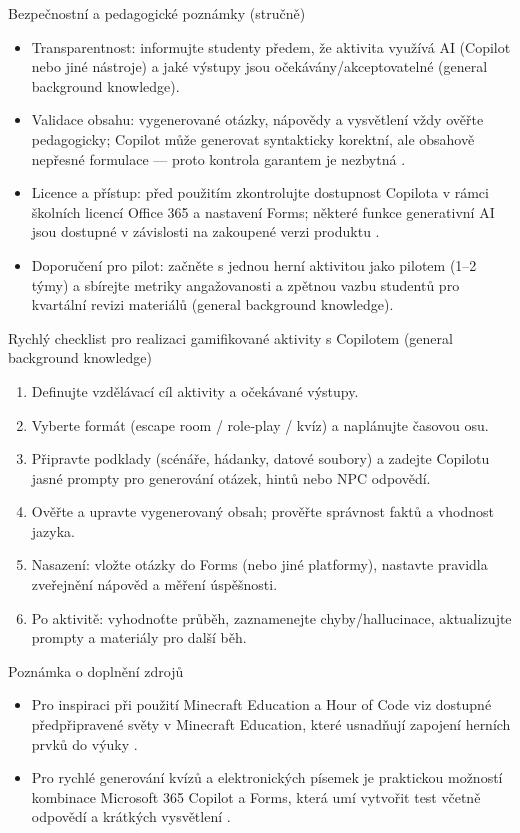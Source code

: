 \documentclass{report}%
\begin{document}
Bezpečnostní a pedagogické poznámky (stručně)
\begin{itemize}
  \item Transparentnost: informujte studenty předem, že aktivita využívá AI (Copilot nebo jiné nástroje) a jaké výstupy jsou očekávány/akceptovatelné (general background knowledge).
  \item Validace obsahu: vygenerované otázky, nápovědy a vysvětlení vždy ověřte pedagogicky; Copilot může generovat syntakticky korektní, ale obsahově nepřesné formulace — proto kontrola garantem je nezbytná \cite{kb_ai_101_tipu_pdf_04e4a115_page_36_1}.
  \item Licence a přístup: před použitím zkontrolujte dostupnost Copilota v rámci školních licencí Office 365 a nastavení Forms; některé funkce generativní AI jsou dostupné v závislosti na zakoupené verzi produktu \cite{kb_ai_101_tipu_pdf_04e4a115_page_3_1}.
  \item Doporučení pro pilot: začněte s jednou herní aktivitou jako pilotem (1–2 týmy) a sbírejte metriky angažovanosti a zpětnou vazbu studentů pro kvartální revizi materiálů (general background knowledge).
\end{itemize}

Rychlý checklist pro realizaci gamifikované aktivity s Copilotem (general background knowledge)
\begin{enumerate}
  \item Definujte vzdělávací cíl aktivity a očekávané výstupy.
  \item Vyberte formát (escape room / role‑play / kvíz) a naplánujte časovou osu.
  \item Připravte podklady (scénáře, hádanky, datové soubory) a zadejte Copilotu jasné prompty pro generování otázek, hintů nebo NPC odpovědí.
  \item Ověřte a upravte vygenerovaný obsah; prověřte správnost faktů a vhodnost jazyka.
  \item Nasazení: vložte otázky do Forms (nebo jiné platformy), nastavte pravidla zveřejnění nápověd a měření úspěšnosti.
  \item Po aktivitě: vyhodnoťte průběh, zaznamenejte chyby/hallucinace, aktualizujte prompty a materiály pro další běh.
\end{enumerate}

Poznámka o doplnění zdrojů
\begin{itemize}
  \item Pro inspiraci při použití Minecraft Education a Hour of Code viz dostupné předpřipravené světy v Minecraft Education, které usnadňují zapojení herních prvků do výuky \cite{kb_ai_101_tipu_pdf_04e4a115_page_15_2}.
  \item Pro rychlé generování kvízů a elektronických písemek je praktickou možností kombinace Microsoft 365 Copilot a Forms, která umí vytvořit test včetně odpovědí a krátkých vysvětlení \cite{kb_ai_101_tipu_pdf_04e4a115_page_36_1}.
\end{itemize}%
\end{document}
